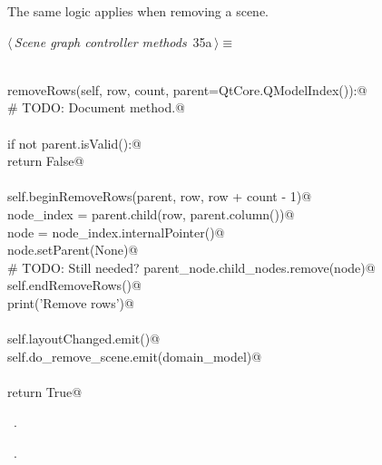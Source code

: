 \documentclass[
    a4paper,      %
    10pt,         %
    openright,    %
    notitlepage,  %
    parskip=half, %
]{scrreprt}       %
\theoremstyle{definition}                    %
\begin{document}
\begin{flushleft}
\begin{minipage}{\linewidth}
\begin{list}{}{\setlength{\itemsep}{-\parsep}\setlength{\itemindent}{-\leftmargin}}
\item{}
\end{list}
\end{minipage}\vspace{4ex}
\end{flushleft}
The same logic applies when removing a scene.

\begin{flushleft} \small
\begin{minipage}{\linewidth}\label{scrap39}\raggedright\small
{} $\langle\,${\itshape Scene graph controller methods}\nobreak\ {\footnotesize {35a}}$\,\rangle\equiv$
\vspace{-1ex}
\begin{list}{}{} \item
\mbox{}\lstinline@@\\
\mbox{}\lstinline@def removeRows(self, row, count, parent=QtCore.QModelIndex()):@\\
\mbox{}\lstinline@    # TODO: Document method.@\\
\mbox{}\lstinline@@\\
\mbox{}\lstinline@    if not parent.isValid():@\\
\mbox{}\lstinline@        return False@\\
\mbox{}\lstinline@@\\
\mbox{}\lstinline@    self.beginRemoveRows(parent, row, row + count - 1)@\\
\mbox{}\lstinline@    node_index = parent.child(row, parent.column())@\\
\mbox{}\lstinline@    node       = node_index.internalPointer()@\\
\mbox{}\lstinline@    node.setParent(None)@\\
\mbox{}\lstinline@    # TODO: Still needed? parent_node.child_nodes.remove(node)@\\
\mbox{}\lstinline@    self.endRemoveRows()@\\
\mbox{}\lstinline@    print('Remove rows')@\\
\mbox{}\lstinline@@\\
\mbox{}\lstinline@    self.layoutChanged.emit()@\\
\mbox{}\lstinline@    self.do_remove_scene.emit(domain_model)@\\
\mbox{}\lstinline@@\\
\mbox{}\lstinline@    return True@\\
\mbox{}\lstinline@@{\NWsep}
\end{list}
\vspace{-1.5ex}
\footnotesize
\begin{list}{}{\setlength{\itemsep}{-\parsep}\setlength{\itemindent}{-\leftmargin}}
\item \NWtxtMacroDefBy\ .
\item \NWtxtMacroRefIn\ .


\end{list}
\end{minipage}
\end{flushleft}
\end{document}
